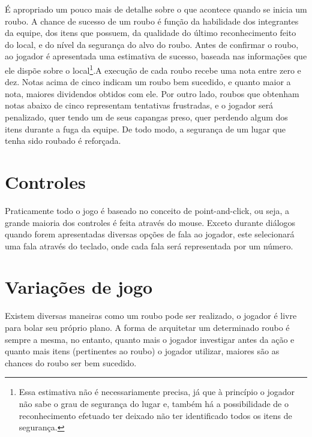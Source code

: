 É apropriado um pouco mais de detalhe sobre o que acontece quando se inicia um roubo. A chance de sucesso de um roubo é função da habilidade dos integrantes da equipe, dos itens que possuem, da qualidade do último reconhecimento feito do local,  e do nível da segurança do alvo do roubo. Antes de confirmar o roubo, ao jogador é apresentada uma estimativa de sucesso, baseada nas informações que ele dispõe sobre o local\footnote{Essa estimativa não é necessariamente precisa, já que à princípio o jogador não sabe o grau de segurança do lugar e, também há a possibilidade de o reconhecimento efetuado ter deixado não ter identificado todos os itens de segurança.}.A execução de cada roubo recebe uma nota entre zero e dez. Notas acima de cinco indicam um roubo bem sucedido, e quanto maior a nota, maiores dividendos obtidos com ele. Por outro lado, roubos que obtenham notas abaixo de cinco representam tentativas frustradas, e o jogador será penalizado, quer tendo um de seus capangas preso, quer perdendo algum dos itens durante a fuga da equipe. De todo modo, a segurança de um lugar que tenha sido roubado é reforçada.

\section{Controles}
Praticamente todo o jogo é baseado no conceito de point-and-click, ou seja, a grande maioria dos controles é feita através do mouse. Exceto durante diálogos quando forem apresentadas diversas opções de fala ao jogador, este selecionará uma fala através do teclado, onde cada fala será representada por um número.

\section{Variações de jogo}
Existem diversas maneiras como um roubo pode ser realizado, o jogador é livre para bolar seu próprio plano. A forma de arquitetar um determinado roubo é sempre a mesma, no entanto, quanto mais o jogador investigar antes da ação e quanto mais itens (pertinentes ao roubo) o jogador utilizar, maiores são as chances do roubo ser bem sucedido.


